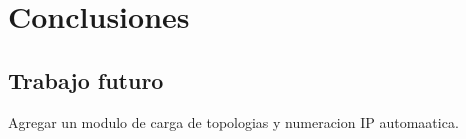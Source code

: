 \chapter{Conclusiones}

\section{Trabajo futuro}
Agregar un modulo de carga de topologias y numeracion IP automaatica.